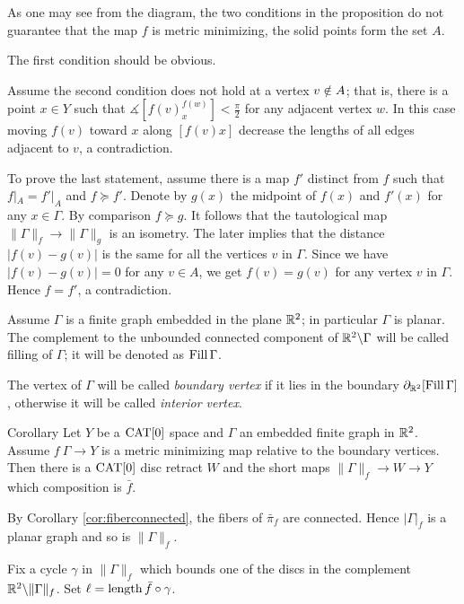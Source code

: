\documentclass{article}
\begin{document}
As one may see from the diagram,
the two conditions in the proposition do not guarantee that the map $f$ is metric minimizing,
the solid points form the set $A$.

The first condition should be obvious.

Assume the second condition does not hold at a vertex $v\zz\notin A$;
that is, there is a point $x\in Y$ such that
$\measuredangle[f(v)^{f(w)}_x]< \tfrac\pi2$
for any adjacent vertex $w$.
In this case moving $f(v)$ toward $x$ along $[f(v)x]$ decrease the lengths of all edges adjacent to $v$, a contradiction.


To prove the last statement, assume there is a map $f'$ distinct from $f$ such that $f|_A=f'|_A$ and $f\succcurlyeq f'$.
Denote by $g(x)$ the midpoint of $f(x)$ and $f'(x)$ for any $x\in \Gamma$. 
By comparison $f\succcurlyeq g$.
It follows that the tautological map $\|\Gamma\|_f\to \|\Gamma\|_g$ is an isometry.
The later implies that the distance $|f(v)-g(v)|$ is the same for all the vertices $v$ in $\Gamma$.
Since we have $|f(v)-g(v)|=0$ for any $v\in A$,
we get $f(v)=g(v)$ for any vertex $v$ in $\Gamma$.
Hence $f=f'$, a contradiction.
\qeds

Assume $\Gamma$ is a finite graph embedded in the plane $\mathbb{R}^2$;
in particular $\Gamma$ is planar.
The complement to the unbounded connected component of $\mathbb{R}^2\backslash\Gamma$ will be called filling of $\Gamma$;
it will be denoted as $\mathop{\rm Fill}\Gamma$.

The vertex of $\Gamma$ will be called \emph{boundary vertex}
if it lies in the boundary $\partial_{\mathbb{R}^2}[\mathop{\rm Fill}\Gamma]$,
otherwise it will be called \emph{interior vertex}.

\begin{thm}{Corollary}\label{cor:planar-minimizing-graph}
Let $Y$ be a $\mathop{\rm CAT}\nolimits[0]$ space and
$\Gamma$ an embedded finite graph in $\mathbb{R}^2$.
Assume $f\:\Gamma\to Y$ is a metric minimizing map relative to the boundary vertices. 
Then there is a $\mathop{\rm CAT}\nolimits[0]$ disc retract $W$
and the short maps $\|\Gamma\|_f\to W\to Y$ which composition is 
 $\bar f$.
\end{thm}


By Corollary \ref{cor:fiberconnected}, the fibers of $\bar\pi_f$ are connected.
Hence $|\Gamma|_f$ is 
a planar graph and so is $\|\Gamma\|_f$.


Fix a cycle $\gamma$ in $\|\Gamma\|_f$ which bounds one of the discs in the complement $\mathbb{R}^2\backslash \|\Gamma\|_f$.
Set $\ell=\mathop{\rm length}\nolimits \bar f\circ\gamma$.
\end{document}
